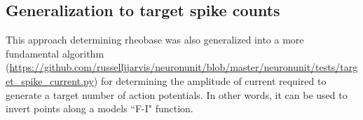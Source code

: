 \subsection{Generalization to target spike counts}
This approach determining rheobase was also generalized into a more fundamental algorithm (\url{https://github.com/russelljjarvis/neuronunit/blob/master/neuronunit/tests/target_spike_current.py}) for determining the amplitude of current required to generate a target number of action potentials.
In other words, it can be used to invert points along a models ``F-I" function.

